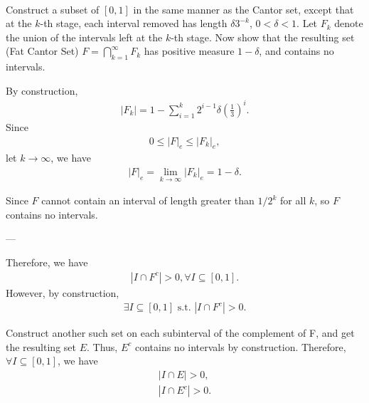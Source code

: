 \documentclass[UTF8,a4paper,10pt]{article}
\begin{document}
  \begin{solution}\,\\

Construct a subset of \([0, 1]\) in the same manner as the Cantor set, except that at the \(k\)-th stage, each interval removed has length \(\delta 3^{-k}\), \(0 < \delta < 1\). Let \(F_k\) denote the union of the intervals left at the \(k\)-th stage.
Now show that the resulting set (Fat Cantor Set) \(F = \bigcap_{k=1}^{\infty} F_k \) has positive measure \(1 - \delta\), and contains no intervals.

By construction,
\begin{equation*}
  \begin{aligned}
    |F_k| = 1 - \sum_{i=1}^{k} 2^{i-1}\delta(\frac{1}{3})^i.
  \end{aligned}
\end{equation*}
Since
\begin{equation*}
  \begin{aligned}
    0\leq|F|_e\leq|F_k|_e,
  \end{aligned}
\end{equation*}
let \(k\to \infty\), we have 
\begin{equation*}
  \begin{aligned}
    |F|_e = \lim_{k \to \infty}|F_k|_e = 1-\delta  .
  \end{aligned}
\end{equation*}

Since \(F\) cannot contain an interval of length greater than \(1/2^k\) for all \(k\), so \(F\) contains no intervals. 

---

Therefore, we have
\begin{equation*}
  \begin{aligned}
    |I\cap F^c| > 0,  \forall I\subseteq[0,1] .
  \end{aligned}
\end{equation*}
However, by construction,
\begin{equation*}
  \begin{aligned}
    \exists I\subseteq[0,1]\text{ s.t. }|I\cap F^c| > 0.
  \end{aligned}
\end{equation*}

Construct another such set on each subinterval of the complement of F, and get the resulting set \(E\). Thus, \(E^c\) contains no intervals by construction. Therefore, \(\forall I\subseteq[0,1]\), we have
\begin{equation*}
  \begin{aligned}
    |I\cap E| > 0,\\
    |I\cap E^c| > 0.
  \end{aligned}
\end{equation*}

    \end{solution}
\end{document}
